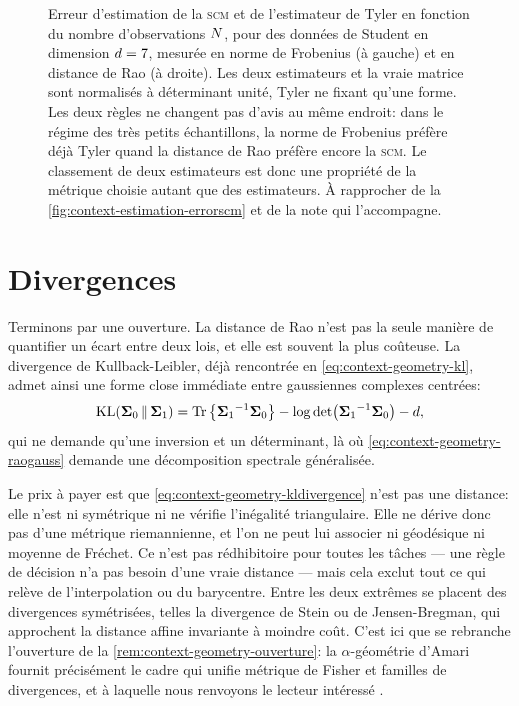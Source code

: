 \begin{figure}[h]
  \begin{center}
    
  \end{center}
  \provErreurraoQR[.5cm]
  \caption{Erreur d'estimation de la \textsc{scm} et de l'estimateur de Tyler
    en fonction du nombre d'observations $N$, pour des données de Student
    en dimension $d=7$, mesurée en norme de Frobenius (à gauche) et en
    distance de Rao (à droite). Les deux estimateurs et la vraie matrice sont
    normalisés à déterminant unité, Tyler ne fixant qu'une forme. Les deux
    règles ne changent pas d'avis au même endroit: dans le régime des très
    petits échantillons, la norme de Frobenius préfère déjà Tyler quand la
    distance de Rao préfère encore la \textsc{scm}. Le classement de deux
    estimateurs est donc une propriété de la métrique choisie autant que des
    estimateurs. À rapprocher de la \cref{fig:context-estimation-errorscm} et
    de la note qui l'accompagne. \provErreurrao}
  \label{fig:context-geometry-erreurrao}
\end{figure}


\section{Divergences}
\label{sec:context-geometry-divergences}

Terminons par une ouverture. La distance de Rao n'est pas la seule manière de quantifier un écart entre deux lois, et elle est souvent la plus coûteuse. La divergence de Kullback-Leibler, déjà rencontrée en \cref{eq:context-geometry-kl}, admet ainsi une forme close immédiate entre gaussiennes complexes centrées:
\begin{equation}
  \mathrm{KL}(\boldsymbol{\Sigma}_0\,\|\,\boldsymbol{\Sigma}_1)
  =
  \operatorname{\operatorname{Tr}}\left\{{\boldsymbol{\Sigma}_1}^{-1}\boldsymbol{\Sigma}_0\right\}
  - \log\operatorname{\operatorname{det}}\!\left({\boldsymbol{\Sigma}_1}^{-1}\boldsymbol{\Sigma}_0\right)
  - d,
  \label{eq:context-geometry-kldivergence}
\end{equation}
qui ne demande qu'une inversion et un déterminant, là où \cref{eq:context-geometry-raogauss} demande une décomposition spectrale généralisée.

Le prix à payer est que \cref{eq:context-geometry-kldivergence} n'est pas une distance: elle n'est ni symétrique ni ne vérifie l'inégalité triangulaire. Elle ne dérive donc pas d'une métrique riemannienne, et l'on ne peut lui associer ni géodésique ni moyenne de Fréchet. Ce n'est pas rédhibitoire pour toutes les tâches --- une règle de décision n'a pas besoin d'une vraie distance --- mais cela exclut tout ce qui relève de l'interpolation ou du barycentre. Entre les deux extrêmes se placent des divergences symétrisées, telles la divergence de Stein ou de Jensen-Bregman, qui approchent la distance affine invariante à moindre coût. C'est ici que se rebranche l'ouverture de la \cref{rem:context-geometry-ouverture}: la $\alpha$-géométrie d'Amari fournit précisément le cadre qui unifie métrique de Fisher et familles de divergences, et à laquelle nous renvoyons le lecteur intéressé .



